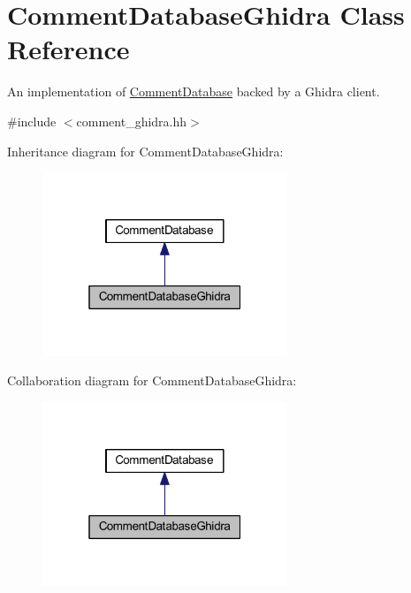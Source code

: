 \hypertarget{class_comment_database_ghidra}{}\section{Comment\+Database\+Ghidra Class Reference}
\label{class_comment_database_ghidra}


An implementation of \mbox{\hyperlink{class_comment_database}{Comment\+Database}} backed by a Ghidra client.  




{\ttfamily \#include $<$comment\+\_\+ghidra.\+hh$>$}



Inheritance diagram for Comment\+Database\+Ghidra\+:
\nopagebreak
\begin{figure}[H]
\begin{center}
\leavevmode
\includegraphics[width=208pt]{class_comment_database_ghidra__inherit__graph}
\end{center}
\end{figure}


Collaboration diagram for Comment\+Database\+Ghidra\+:
\nopagebreak
\begin{figure}[H]
\begin{center}
\leavevmode
\includegraphics[width=208pt]{class_comment_database_ghidra__coll__graph}
\end{center}
\end{figure}

